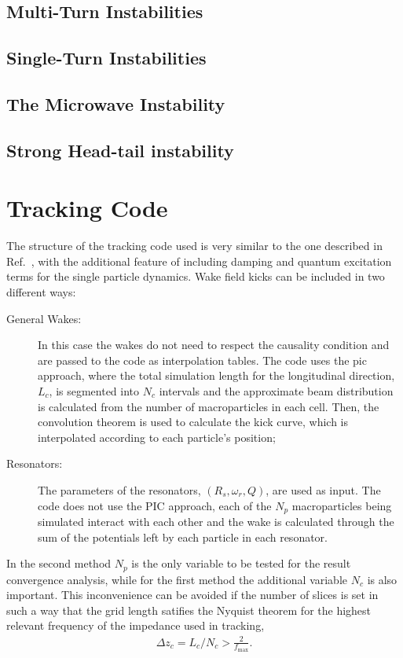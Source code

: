 \subsection{Multi-Turn Instabilities}

\subsection{Single-Turn Instabilities}

\subsection{The Microwave Instability}

\subsection{Strong Head-tail instability}

\section{Tracking Code}\label{sec:tracking_code}

    The structure of the tracking code used is very similar to the one described in Ref.~, with the additional feature of including damping and quantum excitation terms for the single particle dynamics. Wake field kicks can be included in two different ways:
    \begin{description}
        \item[General Wakes:] In this case the wakes do not need to respect the causality condition and are passed to the code as interpolation tables. The code uses the \gls{pic} approach, where the total simulation length for the longitudinal direction, $L_c$, is segmented into $N_c$ intervals and the approximate beam distribution is calculated from the number of macroparticles in each cell. Then, the convolution theorem is used to calculate the kick curve\cite{Bassi2016}, which is interpolated according to each particle's position;
        \item[Resonators:] The parameters of the resonators, $(R_s, \omega_r, Q)$, are used as input. The code does not use the PIC approach, each of the $N_p$ macroparticles being simulated interact with each other and the wake is calculated through the sum of the potentials left by each particle in each resonator.
    \end{description}

    In the second method $N_p$ is the only variable to be tested for the result convergence analysis, while for the first method the additional variable $N_c$ is also important. This inconvenience can be avoided if the number of slices is set in such a way that the grid length satifies the Nyquist theorem for the highest relevant frequency of the impedance used in tracking,
    \begin{align} \label{eq:nyquist_theorem}
        \Delta z_c = L_c/N_c > \frac{2}{f_\text{max}}.
    \end{align}

